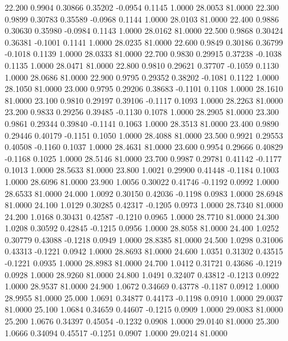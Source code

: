   22.200   0.9904   0.30866   0.35202  -0.0954   0.1145   1.0000  28.0053  81.0000
  22.300   0.9899   0.30783   0.35589  -0.0968   0.1144   1.0000  28.0103  81.0000
  22.400   0.9886   0.30630   0.35980  -0.0984   0.1143   1.0000  28.0162  81.0000
  22.500   0.9868   0.30424   0.36381  -0.1001   0.1141   1.0000  28.0235  81.0000
  22.600   0.9849   0.30186   0.36799  -0.1018   0.1139   1.0000  28.0333  81.0000
  22.700   0.9830   0.29915   0.37238  -0.1038   0.1135   1.0000  28.0471  81.0000
  22.800   0.9810   0.29621   0.37707  -0.1059   0.1130   1.0000  28.0686  81.0000
  22.900   0.9795   0.29352   0.38202  -0.1081   0.1122   1.0000  28.1050  81.0000
  23.000   0.9795   0.29206   0.38683  -0.1101   0.1108   1.0000  28.1610  81.0000
  23.100   0.9810   0.29197   0.39106  -0.1117   0.1093   1.0000  28.2263  81.0000
  23.200   0.9833   0.29256   0.39485  -0.1130   0.1078   1.0000  28.2905  81.0000
  23.300   0.9861   0.29344   0.39840  -0.1141   0.1063   1.0000  28.3513  81.0000
  23.400   0.9890   0.29446   0.40179  -0.1151   0.1050   1.0000  28.4088  81.0000
  23.500   0.9921   0.29553   0.40508  -0.1160   0.1037   1.0000  28.4631  81.0000
  23.600   0.9954   0.29666   0.40829  -0.1168   0.1025   1.0000  28.5146  81.0000
  23.700   0.9987   0.29781   0.41142  -0.1177   0.1013   1.0000  28.5633  81.0000
  23.800   1.0021   0.29900   0.41448  -0.1184   0.1003   1.0000  28.6096  81.0000
  23.900   1.0056   0.30022   0.41746  -0.1192   0.0992   1.0000  28.6533  81.0000
  24.000   1.0092   0.30150   0.42036  -0.1198   0.0983   1.0000  28.6948  81.0000
  24.100   1.0129   0.30285   0.42317  -0.1205   0.0973   1.0000  28.7340  81.0000
  24.200   1.0168   0.30431   0.42587  -0.1210   0.0965   1.0000  28.7710  81.0000
  24.300   1.0208   0.30592   0.42845  -0.1215   0.0956   1.0000  28.8058  81.0000
  24.400   1.0252   0.30779   0.43088  -0.1218   0.0949   1.0000  28.8385  81.0000
  24.500   1.0298   0.31006   0.43313  -0.1221   0.0942   1.0000  28.8693  81.0000
  24.600   1.0351   0.31302   0.43515  -0.1221   0.0935   1.0000  28.8983  81.0000
  24.700   1.0412   0.31721   0.43686  -0.1219   0.0928   1.0000  28.9260  81.0000
  24.800   1.0491   0.32407   0.43812  -0.1213   0.0922   1.0000  28.9537  81.0000
  24.900   1.0672   0.34669   0.43778  -0.1187   0.0912   1.0000  28.9955  81.0000
  25.000   1.0691   0.34877   0.44173  -0.1198   0.0910   1.0000  29.0037  81.0000
  25.100   1.0684   0.34659   0.44607  -0.1215   0.0909   1.0000  29.0083  81.0000
  25.200   1.0676   0.34397   0.45054  -0.1232   0.0908   1.0000  29.0140  81.0000
  25.300   1.0666   0.34094   0.45517  -0.1251   0.0907   1.0000  29.0214  81.0000
